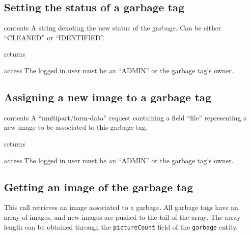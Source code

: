 \subsection{Setting the status of a garbage tag}

\begin{apidata}{contents}
  A string denoting the new status of the garbage. Can be either ``CLEANED'' or
  ``IDENTIFIED''.
\end{apidata}
\begin{apidata}{returns}
  \begin{datalist}
  \end{datalist}
\end{apidata}
\begin{apidata}{access}
The logged in user must be an ``ADMIN'' or the garbage tag's owner.
\end{apidata}


\subsection{Assigning a new image to a garbage tag}

\begin{apidata}{contents}
  A ``multipart/form-data'' request containing a field ``file'' representing a
  new image to be associated to this garbage tag.
\end{apidata}
\begin{apidata}{returns}
  \begin{datalist}
  \end{datalist}
\end{apidata}
\begin{apidata}{access}
The logged in user must be an ``ADMIN'' or the garbage tag's owner.
\end{apidata}


\subsection{Getting an image of the garbage tag}

This call retrieves an image associated to a garbage. All garbage tags have an
array of images, and new images are pushed to the tail of the array. The array
length can be obtained through the \texttt{pictureCount} field of the
\texttt{garbage} entity. 

